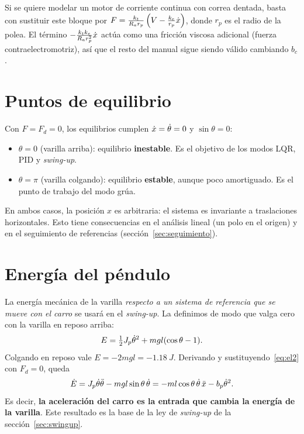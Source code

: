 \begin{nota}
Si se quiere modelar un motor de corriente continua con correa dentada, basta con sustituir este bloque por $F=\frac{k_t}{R_a r_p}\left(V-\frac{k_e}{r_p}\dot{x}\right)$, donde $r_p$ es el radio de la polea. El término $-\frac{k_tk_e}{R_ar_p^2}\dot{x}$ actúa como una fricción viscosa adicional (fuerza contraelectromotriz), así que el resto del manual sigue siendo válido cambiando $b_c$.
\end{nota}

\section{Puntos de equilibrio}

Con $F=F_d=0$, los equilibrios cumplen $\dot{x}=\dot{\theta}=0$ y $\sin\theta=0$:
\begin{itemize}
  \item $\theta=0$ (varilla arriba): equilibrio \textbf{inestable}. Es el objetivo de los modos LQR, PID y \emph{swing-up}.
  \item $\theta=\pi$ (varilla colgando): equilibrio \textbf{estable}, aunque poco amortiguado. Es el punto de trabajo del modo grúa.
\end{itemize}
En ambos casos, la posición $x$ es arbitraria: el sistema es invariante a traslaciones horizontales. Esto tiene consecuencias en el análisis lineal (un polo en el origen) y en el seguimiento de referencias (sección~\ref{sec:seguimiento}).

\section{Energía del péndulo}

La energía mecánica de la varilla \emph{respecto a un sistema de referencia que se mueve con el carro} se usará en el \emph{swing-up}. La definimos de modo que valga cero con la varilla en reposo arriba:
\begin{equation}
  E = \tfrac12J_p\dot{\theta}^2 + mgl(\cos\theta-1).
  \label{eq:energia}
\end{equation}
Colgando en reposo vale $E=-2mgl=\SI{-1.18}{J}$. Derivando y sustituyendo~\eqref{eq:el2} con $F_d=0$, queda
\begin{equation}
  \dot E = J_p\dot{\theta}\ddot{\theta} - mgl\sin\theta\,\dot{\theta} = -ml\cos\theta\,\dot{\theta}\,\ddot{x} - b_p\dot{\theta}^2 .
  \label{eq:Edot}
\end{equation}
Es decir, \textbf{la aceleración del carro es la entrada que cambia la energía de la varilla}. Este resultado es la base de la ley de \emph{swing-up} de la sección~\ref{sec:swingup}.
